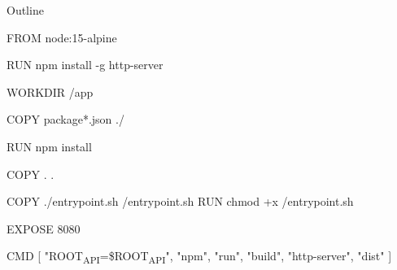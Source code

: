 \documentclass[presentation]{beamer}
\date{\today}
\title{}
\begin{document}
\begin{frame}{Outline}
\tableofcontents
\end{frame}

FROM node:15-alpine

RUN npm install -g http-server

WORKDIR /app

COPY package*.json ./

RUN npm install

COPY . .

COPY ./entrypoint.sh /entrypoint.sh
RUN chmod +x /entrypoint.sh

EXPOSE 8080

CMD [ "ROOT\textsubscript{API}=\$ROOT\textsubscript{API}", "npm", "run", "build", "http-server", "dist" ]
\end{document}
